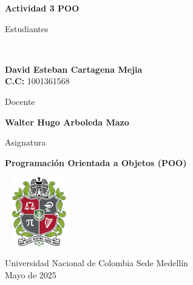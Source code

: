 \begin{titlepage}
	\Large{
	\begin{center}
		\vspace*{1cm}
 
		\textbf{Actividad 3  POO}
 
			 
		\vspace{1.5cm}
		
		Estudiantes
		
		\vspace{0.5cm}
		 \

 
		\textbf{David Esteban Cartagena Mejia} \\
		  \textbf{C.C:} 1001361568 \\	
		  
	 
 
	   \vspace{1cm}
		
		Docente 
		
		\vspace{0.5cm}
 
		\textbf{Walter Hugo Arboleda Mazo}
		\vspace{0.4cm}
		\vspace{1cm}
		
		Asignatura
		
		\vspace{0.5cm}
 
		\textbf{Programación Orientada a Objetos (POO)}
 
		\vfill
 
		\includegraphics[width=3cm,height=3cm]{logo.png}\\[0.2cm]
	  
		\vspace{0.2cm}
	  
				 
		Universidad Nacional de Colombia Sede Medellín\\
		Mayo de 2025
		
	\end{center}
	}
 \end{titlepage}